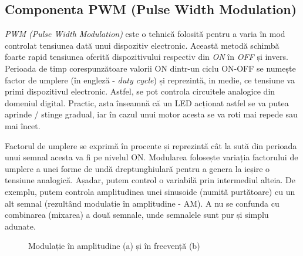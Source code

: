

\subsection{Componenta PWM (Pulse Width Modulation)}

\textit{PWM (Pulse Width Modulation)} este o tehnică folosită pentru a varia în mod controlat tensiunea dată unui dispozitiv electronic. Această metodă schimbă foarte rapid tensiunea oferită dispozitivului respectiv din \textit{ON} în \textit{OFF} și invers. Perioada de timp corespunzătoare valorii ON dintr-un ciclu ON-OFF se numește factor de umplere (în engleză - \textit{duty cycle}) și reprezintă, in medie, ce tensiune va primi dispozitivul electronic. Astfel, se pot controla circuitele analogice din domeniul digital. Practic, asta înseamnă că un LED acționat astfel se va putea aprinde / stinge gradual, iar în cazul unui motor acesta se va roti mai repede sau mai încet.

Factorul de umplere se exprimă în procente și reprezintă cât la sută din perioada unui semnal acesta va fi pe nivelul ON. Modularea folosește variația factorului de umplere a unei forme de undă dreptunghiulară pentru a genera la ieșire o tensiune analogică. Așadar, putem control o variabilă prin intermediul alteia. De exemplu, putem controla amplitudinea unei sinusoide (numită purtătoare) cu un alt semnal (rezultând modulatie în amplitudine - AM). A nu se confunda cu combinarea (mixarea) a două semnale, unde semnalele sunt pur și simplu adunate.

\begin{figure}
    \centering
    \caption{Modulație în amplitudine (a) și în frecvență (b)} 
    \label{fig:CodeWarrior-Modulation} 
\end{figure} 

